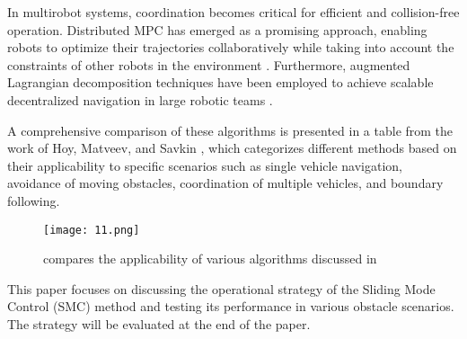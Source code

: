 In multirobot systems, coordination becomes critical for efficient and collision-free operation. Distributed MPC has emerged as a promising approach, enabling robots to optimize their trajectories collaboratively while taking into account the constraints of other robots in the environment \cite{Turpin2014}. Furthermore, augmented Lagrangian decomposition techniques have been employed to achieve scalable decentralized navigation in large robotic teams \cite{Dunbar2006}.

 A comprehensive comparison of these algorithms is presented in a table from the work of Hoy, Matveev, and Savkin \cite{Hoy2015}, which categorizes different methods based on their applicability to specific scenarios such as single vehicle navigation, avoidance of moving obstacles, coordination of multiple vehicles, and boundary following.

 \begin{figure}[H]
    \centering
    \texttt{[image: 11.png]}
    \caption{compares the applicability of various algorithms discussed in \cite{Hoy2015}}
    \label{FIG:11}
\end{figure}

This paper focuses on discussing the operational strategy of the Sliding Mode Control (SMC) method and testing its performance in various obstacle scenarios. The strategy will be evaluated at the end of the paper.
